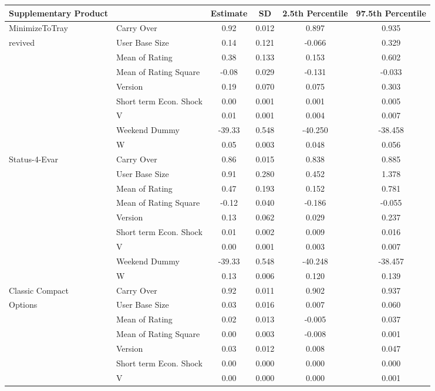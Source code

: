 \documentclass[mksc,nonblindrev]{informs3}
\begin{document}
\begin{table}
	\centering
		\begin{tabular}{llcccc}\hline \hline
Supplementary Product	&		&	Estimate	&	SD	&	2.5th 
Percentile	&	97.5th 
Percentile	\\ \hline
MinimizeToTray	&	Carry Over	&	0.92	&	0.012	&	0.897	&	0.935	\\
revived	&	User Base Size	&	0.14	&	0.121	&	-0.066	&	0.329	\\
	&	Mean of Rating	&	0.38	&	0.133	&	0.153	&	0.602	\\
	&	Mean of Rating Square	&	-0.08	&	0.029	&	-0.131	&	-0.033	\\
	&	Version	&	0.19	&	0.070	&	0.075	&	0.303	\\
	&	Short term Econ. Shock	&	0.00	&	0.001	&	0.001	&	0.005	\\
	&	V	&	0.01	&	0.001	&	0.004	&	0.007	\\
	&	Weekend Dummy	&	-39.33	&	0.548	&	-40.250	&	-38.458	\\
	&	W	&	0.05	&	0.003	&	0.048	&	0.056	\\
Status-4-Evar	&	Carry Over	&	0.86	&	0.015	&	0.838	&	0.885	\\
	&	User Base Size	&	0.91	&	0.280	&	0.452	&	1.378	\\
	&	Mean of Rating	&	0.47	&	0.193	&	0.152	&	0.781	\\
	&	Mean of Rating Square	&	-0.12	&	0.040	&	-0.186	&	-0.055	\\
	&	Version	&	0.13	&	0.062	&	0.029	&	0.237	\\
	&	Short term Econ. Shock	&	0.01	&	0.002	&	0.009	&	0.016	\\
	&	V	&	0.00	&	0.001	&	0.003	&	0.007	\\
	&	Weekend Dummy	&	-39.33	&	0.548	&	-40.248	&	-38.457	\\
	&	W	&	0.13	&	0.006	&	0.120	&	0.139	\\
Classic Compact	&	Carry Over	&	0.92	&	0.011	&	0.902	&	0.937	\\
 Options	&	User Base Size	&	0.03	&	0.016	&	0.007	&	0.060	\\
	&	Mean of Rating	&	0.02	&	0.013	&	-0.005	&	0.037	\\
	&	Mean of Rating Square	&	0.00	&	0.003	&	-0.008	&	0.001	\\
	&	Version	&	0.03	&	0.012	&	0.008	&	0.047	\\
	&	Short term Econ. Shock	&	0.00	&	0.000	&	0.000	&	0.000	\\
	&	V	&	0.00	&	0.000	&	0.000	&	0.001	\\

\end{tabular}
\end{table}
\end{document}
